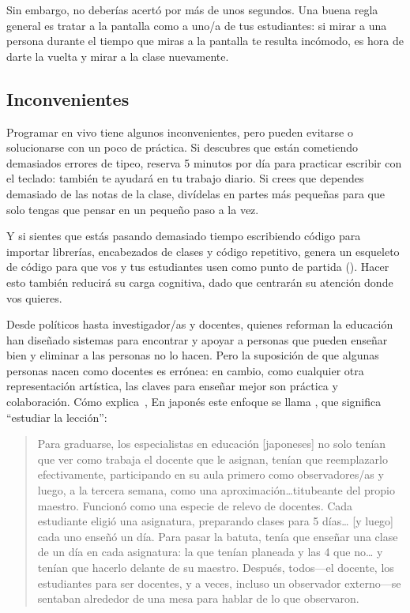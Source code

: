 Sin embargo, no deberías acertó por más de unos segundos.
Una buena regla general es tratar a la pantalla como a uno/a de tus estudiantes:
si mirar a una persona durante el tiempo que miras a la pantalla te resulta incómodo, es hora de darte la vuelta y mirar a la clase nuevamente.

\subsection*{Inconvenientes}

Programar en vivo tiene algunos inconvenientes,
pero pueden evitarse o solucionarse con un poco de práctica.
Si descubres que están cometiendo demasiados errores de tipeo,
reserva 5 minutos por día para practicar escribir con el teclado:
también te ayudará en tu trabajo diario.
Si crees que dependes demasiado de las notas de la clase,
divídelas en partes más pequeñas 
para que solo tengas que pensar en un pequeño paso a la vez.

Y si sientes que estás pasando demasiado tiempo escribiendo código para importar librerías, encabezados de clases y código repetitivo, 
genera un esqueleto de código para que vos y tus estudiantes usen como punto de partida ().
Hacer esto también reducirá su carga cognitiva,
dado que centrarán su atención donde vos quieres.


Desde políticos hasta investigador/as y docentes,
quienes reforman la educación han diseñado sistemas 
para encontrar y apoyar a personas que pueden enseñar bien
y eliminar a las personas no lo hacen.
Pero la suposición de que algunas personas nacen como docentes es errónea:
en cambio,
como cualquier otra representación artística,
las claves para enseñar mejor son práctica y colaboración.
Cómo explica~\cite{Gree2014},
En japonés este enfoque se llama ,
que significa ``estudiar la lección'':

\begin{quote}

  Para graduarse,
  los especialistas en educación [japoneses] no solo tenían que ver como trabaja el docente que le asignan,
  tenían que reemplazarlo efectivamente,
  participando en su aula primero como observadores/as y luego,
  a la tercera semana,
  como una aproximación{\ldots}titubeante del propio maestro.
  Funcionó como una especie de relevo de docentes.
  Cada estudiante eligió una asignatura,
  preparando clases para 5 días{\ldots} [y luego] cada uno enseñó un día.
  Para pasar la batuta,
  tenía que enseñar una clase de un día en cada asignatura:
  la que tenían planeada y las 4 que no{\ldots}
  y tenían que hacerlo delante de su maestro.
  Después, todos---el docente, los estudiantes para ser docentes,
  y a veces, incluso un observador externo---se sentaban alrededor de una mesa
  para hablar de lo que observaron.

\end{quote}

